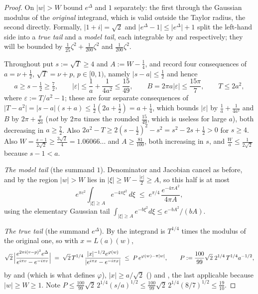\begin{proof}
\leanok
{}
On $\lvert w\rvert>W$ bound $e^{\Delta}$ and $1$ separately: the first through the Gaussian
modulus of the \emph{original} integrand, which is valid outside the Taylor radius, the second
directly.  Formally, $\lvert1+i\rvert=\sqrt2$ and
$\lvert e^{\Delta}-1\rvert\le\lvert e^{\Delta}\rvert+1$ split the left-hand side into a
\emph{true tail} and a \emph{model tail}, each integrable by  and
 respectively; they will be bounded by
$\tfrac1{25}\zeta^{2}+\tfrac1{200}\zeta^{2}$ and $\tfrac1{200}\zeta^{2}$.

Throughout put $s:=\sqrt T\ge4$ and $A:=W-\tfrac14$, and record four consequences of
$a=\nu+\tfrac12$, $\sqrt T=\nu+p$, $p\in[0,1)$, namely $\lvert s-a\rvert\le\tfrac12$ and hence
\begin{equation}\label{eq:rsf_outer_sharp_data}
  a\ge s-\tfrac12\ge\tfrac72,\qquad
  \lvert\varepsilon\rvert\le\frac1a+\frac1{4a^{2}}\le\frac{15}{49},\qquad
  B=2\pi a\lvert\varepsilon\rvert\le\frac{15\pi}7,\qquad
  T\le2a^{2},
\end{equation}
where $\varepsilon:=T/a^{2}-1$; these are four separate consequences of
$\lvert T-a^{2}\rvert=\lvert s-a\rvert(s+a)\le\tfrac12(2a+\tfrac12)=a+\tfrac14$, which bounds
$\lvert\varepsilon\rvert$ by $\tfrac1a+\tfrac1{4a^{2}}$ and $B$ by $2\pi+\tfrac\pi{2a}$
(\emph{not} by $2\pi a$ times the rounded $\tfrac{15}{49}$, which is useless for large $a$),
both decreasing in $a\ge\tfrac72$.  Also
$2a^{2}-T\ge2(s-\tfrac12)^{2}-s^{2}=s^{2}-2s+\tfrac12>0$ for $s\ge4$.  Also
$W=\tfrac{s-1}{2\sqrt2}\ge\tfrac{3\sqrt2}4=1.06066\ldots$ and $A\ge\tfrac{81}{100}$, both
increasing in $s$, and $\tfrac Wa\le\tfrac1{2\sqrt2}$ because $s-1<a$.

\emph{The model tail} (the summand $1$).  Denominator and Jacobian cancel as before, and by
 the region $\lvert w\rvert>W$ lies in $\lvert\xi\rvert\ge
W-\tfrac{\lvert c\rvert}2\ge A$, so this half is at most
\[
  e^{\pi c^{2}}\int_{\lvert\xi\rvert\ge A}e^{-4\pi\xi^{2}}\,d\xi
  \;\le\;e^{\pi/4}\,\frac{e^{-4\pi A^{2}}}{4\pi A} ,
\]
using the elementary Gaussian tail $\int_{\lvert\xi\rvert\ge A}e^{-b\xi^{2}}d\xi\le
e^{-bA^{2}}/(bA)$.

\emph{The true tail} (the summand $e^{\Delta}$).  By  the integrand is
$T^{1/4}$ times the modulus of the original one, so with $x=L(a)(w)$,
\[
  \sqrt2\,\Bigl\lvert\frac{e^{2\pi i(v-p)^{2}}e^{\Delta}}{e^{i\pi v}-e^{-i\pi v}}\Bigr\rvert
  \;=\;\sqrt2\,T^{1/4}\,\frac{\lvert x\rvert^{-1/2}e^{\varphi(w)}}
       {\lvert e^{i\pi x}-e^{-i\pi x}\rvert}
  \;\le\;P\,e^{\varphi(w)-\pi\lvert w\rvert},
  \qquad P:=\frac{100}{99}\sqrt2\;2^{1/4}\,T^{1/4}a^{-1/2},
\]
by  and  (which is what defines $\varphi$),
$\lvert x\rvert\ge a/\sqrt2$ () and , the last
applicable because $\lvert w\rvert\ge W\ge1$.  Note
$P\le\tfrac{100}{99}\sqrt2\,2^{1/4}(s/a)^{1/2}\le\tfrac{100}{99}\sqrt2\,2^{1/4}(8/7)^{1/2}
\le\tfrac{19}{10}$.


\end{proof}
